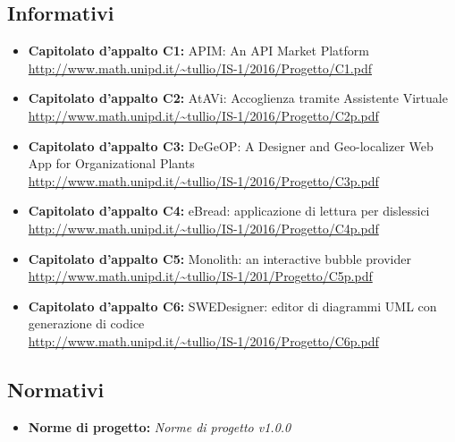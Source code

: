 \documentclass[a4paper]{report}
\begin{document}
        	\subsection{Informativi}
        		\begin{itemize}
        			\item \textbf{Capitolato d'appalto C1:} APIM: An API Market Platform \\
        			\url{http://www.math.unipd.it/~tullio/IS-1/2016/Progetto/C1.pdf}
        			\item \textbf{Capitolato d'appalto C2:} AtAVi: Accoglienza tramite Assistente Virtuale \\
        			\url{http://www.math.unipd.it/~tullio/IS-1/2016/Progetto/C2p.pdf}
        			\item \textbf{Capitolato d'appalto C3:} DeGeOP: A Designer and Geo-localizer Web App for
              Organizational Plants \\
        			\url{http://www.math.unipd.it/~tullio/IS-1/2016/Progetto/C3p.pdf}
        			\item \textbf{Capitolato d'appalto C4:} eBread: applicazione di lettura per dislessici \\
        			\url{http://www.math.unipd.it/~tullio/IS-1/2016/Progetto/C4p.pdf}
        			\item \textbf{Capitolato d'appalto C5:} Monolith: an interactive bubble provider \\
        			\url{http://www.math.unipd.it/~tullio/IS-1/201/Progetto/C5p.pdf}
        			\item \textbf{Capitolato d'appalto C6:} SWEDesigner: editor di diagrammi UML con generazione di codice \\
        			\url{http://www.math.unipd.it/~tullio/IS-1/2016/Progetto/C6p.pdf}
        		\end{itemize}
        	\subsection{Normativi}
        		\begin{itemize}
        			\item \textbf{Norme di progetto:} \emph{Norme di progetto v1.0.0}
        		\end{itemize}
\end{document}
